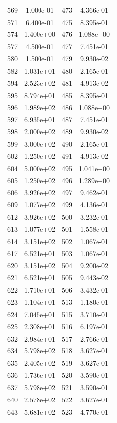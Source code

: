 \documentclass[12pt]{article}
\begin{document}
\begin{longtable}{@{}cccc@{}}
569 & 1.000e-01 & 473 & 4.366e-01 \\
571 & 6.400e-01 & 475 & 8.395e-01 \\
574 & 1.400e+00 & 476 & 1.088e+00 \\
577 & 4.500e-01 & 477 & 7.451e-01 \\
580 & 1.500e-01 & 479 & 9.930e-02 \\
582 & 1.031e+01 & 480 & 2.165e-01 \\
594 & 2.523e+02 & 481 & 4.913e-02 \\
595 & 8.794e+01 & 485 & 8.395e-01 \\
596 & 1.989e+02 & 486 & 1.088e+00 \\
597 & 6.935e+01 & 487 & 7.451e-01 \\
598 & 2.000e+02 & 489 & 9.930e-02 \\
599 & 3.000e+02 & 490 & 2.165e-01 \\
602 & 1.250e+02 & 491 & 4.913e-02 \\
604 & 5.000e+02 & 495 & 1.041e+00 \\
605 & 1.250e+02 & 496 & 1.289e+00 \\
606 & 3.926e+02 & 497 & 9.462e-01 \\
609 & 1.077e+02 & 499 & 4.136e-01 \\
612 & 3.926e+02 & 500 & 3.232e-01 \\
613 & 1.077e+02 & 501 & 1.558e-01 \\
614 & 3.151e+02 & 502 & 1.067e-01 \\
617 & 6.521e+01 & 503 & 1.067e-01 \\
620 & 3.151e+02 & 504 & 9.200e-02 \\
621 & 6.521e+01 & 505 & 9.443e-02 \\
622 & 1.710e+01 & 506 & 3.432e-01 \\
623 & 1.104e+01 & 513 & 1.180e-01 \\
624 & 7.045e+01 & 515 & 3.710e-01 \\
625 & 2.308e+01 & 516 & 6.197e-01 \\
632 & 2.984e+01 & 517 & 2.766e-01 \\
634 & 5.798e+02 & 518 & 3.627e-01 \\
635 & 2.405e+02 & 519 & 3.627e-01 \\
636 & 1.736e+01 & 520 & 3.590e-01 \\
637 & 5.798e+02 & 521 & 3.590e-01 \\
640 & 2.578e+02 & 522 & 3.627e-01 \\
643 & 5.681e+02 & 523 & 4.770e-01 \\

\end{longtable}
\end{document}
